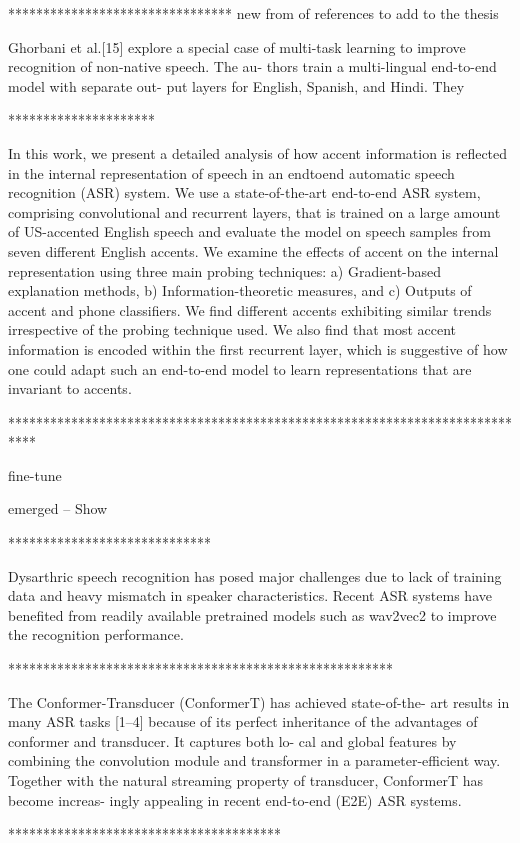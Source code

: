 ********************************
 new from of references to add to the thesis

Ghorbani et al.[15] explore a special case of multi-task
learning to improve recognition of non-native speech. The au- thors train a multi-lingual end-to-end model with separate out- put layers for English, Spanish, and Hindi. They


*********************




In this work, we present a detailed analysis of
how accent information is reflected in the internal representation of speech in an endtoend automatic speech recognition (ASR) system. We use a state-of-the-art end-to-end ASR
system, comprising convolutional and recurrent layers, that is trained on a large amount of
US-accented English speech and evaluate the
model on speech samples from seven different
English accents. We examine the effects of accent on the internal representation using three
main probing techniques: a) Gradient-based
explanation methods, b) Information-theoretic
measures, and c) Outputs of accent and phone
classifiers. We find different accents exhibiting similar trends irrespective of the probing
technique used. We also find that most accent information is encoded within the first recurrent layer, which is suggestive of how one
could adapt such an end-to-end model to learn
representations that are invariant to accents.

****************************************************************************

fine-tune

emerged  -- Show 

*****************************


Dysarthric speech recognition has posed major challenges due to lack of training data and heavy mismatch in speaker characteristics. Recent ASR systems have benefited from readily available pretrained models such as wav2vec2 to improve the recognition performance. 

*******************************************************

The Conformer-Transducer (ConformerT) has achieved state-of-the- art results in many ASR tasks [1–4] because of its perfect inheritance of the advantages of conformer and transducer. It captures both lo- cal and global features by combining the convolution module and transformer in a parameter-efficient way. Together with the natural streaming property of transducer, ConformerT has become increas- ingly appealing in recent end-to-end (E2E) ASR systems.


***************************************